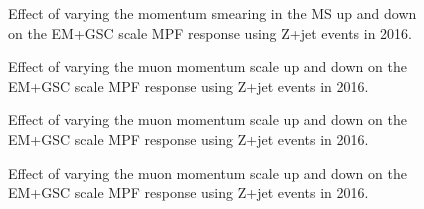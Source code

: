 \begin{figure}[!ht]
  \begin{center}
  \end{center}
  \caption[Muon MS uncertainty, EM+GSC scale with 2016 Z+jet]
  {Effect of varying the momentum smearing in the MS up and down on the EM+GSC scale MPF response using Z+jet events in 2016. }
  \label{plot:ZJetEM2016MSApp}
\end{figure}
\begin{figure}[!ht]
  \begin{center}
  \end{center}
  \caption[Muon inner detector uncertainty, EM+GSC scale with 2016 Z+jet]
  {Effect of varying the muon momentum scale up and down on the EM+GSC scale MPF response using Z+jet events in 2016.}
  \label{plot:ZJetEM2016MScaleApp}
\end{figure}

\begin{figure}[!ht]
  \begin{center}
  \end{center}
  \caption[Muon inner detector uncertainty, EM+GSC scale with 2016 Z+jet]
  {Effect of varying the muon momentum scale up and down on the EM+GSC scale MPF response using Z+jet events in 2016.}
  \label{plot:ZJetEM2016MScaleApp}
\end{figure}

\begin{figure}[!ht]
  \begin{center}
  \end{center}
  \caption[Muon inner detector uncertainty, EM+GSC scale with 2016 Z+jet]
  {Effect of varying the muon momentum scale up and down on the EM+GSC scale MPF response using Z+jet events in 2016.}
  \label{plot:ZJetEM2016MScaleApp}
\end{figure}


